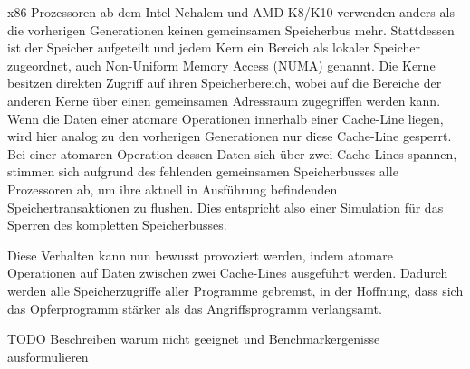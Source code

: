 x86-Prozessoren ab dem Intel Nehalem und AMD K8/K10 verwenden anders als die vorherigen Generationen keinen gemeinsamen Speicherbus mehr. Stattdessen ist der Speicher aufgeteilt und jedem Kern ein Bereich als lokaler Speicher zugeordnet, auch Non-Uniform Memory Access   (NUMA) genannt. 
Die Kerne besitzen direkten Zugriff auf ihren Speicherbereich, wobei auf die Bereiche der anderen Kerne über einen gemeinsamen Adressraum zugegriffen werden kann.
Wenn die Daten einer atomare Operationen innerhalb einer Cache-Line liegen, wird hier analog zu den vorherigen Generationen nur diese Cache-Line gesperrt.
Bei einer atomaren Operation dessen Daten sich über zwei Cache-Lines spannen, stimmen sich aufgrund des fehlenden gemeinsamen Speicherbusses alle Prozessoren ab, um ihre aktuell in Ausführung befindenden Speichertransaktionen zu flushen.
Dies entspricht also einer Simulation für das Sperren des kompletten Speicherbusses.

Diese Verhalten kann nun bewusst provoziert werden, indem atomare Operationen auf Daten zwischen zwei Cache-Lines ausgeführt werden.
Dadurch werden alle Speicherzugriffe aller Programme gebremst, in der Hoffnung, dass sich das Opferprogramm stärker als das Angriffsprogramm verlangsamt.

TODO Beschreiben warum nicht geeignet und Benchmarkergenisse ausformulieren









